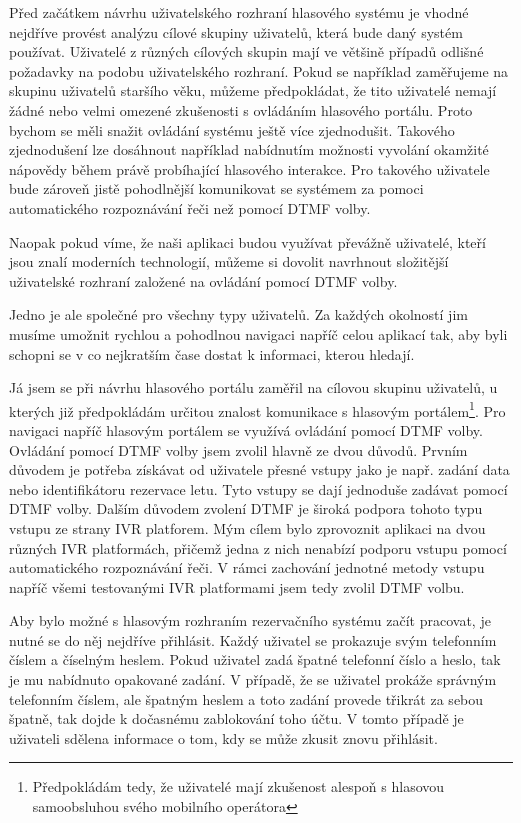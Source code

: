 \documentclass[ing,male,java,dept460]{diploma}						%
\begin{document}
Před začátkem návrhu uživatelského rozhraní hlasového systému je vhodné nejdříve provést analýzu cílové skupiny uživatelů, která bude daný systém používat. Uživatelé z různých cílových skupin mají ve většině případů odlišné požadavky na podobu uživatelského rozhraní. Pokud se například zaměřujeme na skupinu uživatelů staršího věku, můžeme předpokládat, že tito uživatelé nemají žádné nebo velmi omezené zkušenosti s ovládáním hlasového portálu. Proto bychom se měli snažit ovládání systému ještě více zjednodušit. Takového zjednodušení lze dosáhnout například nabídnutím možnosti vyvolání okamžité nápovědy během právě probíhající hlasového interakce. Pro takového uživatele bude zároveň jistě pohodlnější komunikovat se systémem za pomoci automatického rozpoznávání řeči než pomocí DTMF volby.

Naopak pokud víme, že naši aplikaci budou využívat převážně uživatelé, kteří jsou znalí moderních technologií, můžeme si dovolit navrhnout složitější uživatelské rozhraní založené na ovládání pomocí DTMF volby.

Jedno je ale společné pro všechny typy uživatelů. Za každých okolností jim musíme umožnit rychlou a pohodlnou navigaci napříč celou aplikací tak, aby byli schopni se v co nejkratším čase dostat k informaci, kterou hledají.

Já jsem se při návrhu hlasového portálu zaměřil na cílovou skupinu uživatelů, u kterých již předpokládám určitou znalost komunikace s hlasovým portálem\footnote{Předpokládám tedy, že uživatelé mají zkušenost alespoň s hlasovou samoobsluhou svého mobilního operátora}. Pro navigaci napříč hlasovým portálem se využívá ovládání pomocí DTMF volby. Ovládání pomocí DTMF volby jsem zvolil hlavně ze dvou důvodů. Prvním důvodem je potřeba získávat od uživatele přesné vstupy jako je např. zadání data nebo identifikátoru rezervace letu. Tyto vstupy se dají jednoduše zadávat pomocí DTMF volby. Dalším důvodem zvolení DTMF je široká podpora tohoto typu vstupu ze strany IVR platforem. Mým cílem bylo zprovoznit aplikaci na dvou různých IVR platformách, přičemž jedna z nich nenabízí podporu vstupu pomocí automatického rozpoznávání řeči. V rámci zachování jednotné metody vstupu napříč všemi testovanými IVR platformami jsem tedy zvolil DTMF volbu.

Aby bylo možné s hlasovým rozhraním rezervačního systému začít pracovat, je nutné se do něj nejdříve přihlásit. Každý uživatel se prokazuje svým telefonním číslem a číselným heslem. Pokud uživatel zadá špatné telefonní číslo a heslo, tak je mu nabídnuto opakované zadání. V případě, že se uživatel prokáže správným telefonním číslem, ale špatným heslem a toto zadání provede třikrát za sebou špatně, tak dojde k dočasnému zablokování toho účtu. V tomto případě je uživateli sdělena informace o tom, kdy se může zkusit znovu přihlásit.
\end{document}
